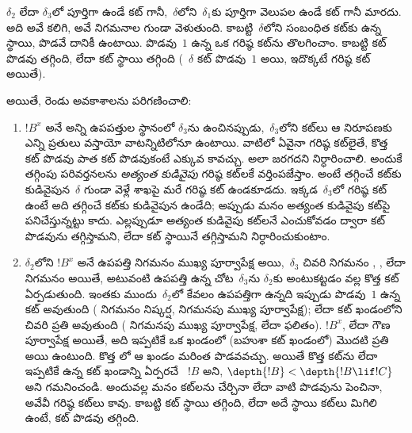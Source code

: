 \documentclass[../../../include/open-logic-section]{subfiles}
\begin{document}
$\delta_2$ లేదా $\delta_3$లో పూర్తిగా ఉండే కట్ గానీ,~$\delta$లోని~$\delta_1$కు పూర్తిగా వెలుపల ఉండే కట్ గానీ మారదు. అది అవే  కలిగి, అవే నిగమనాల గుండా వెళుతుంది. కాబట్టి~$\delta$లోని సంబంధిత కట్‌కు ఉన్న స్థాయి, పొడవే దానికీ ఉంటాయి. పొడవు~$1$ ఉన్న ఒక గరిష్ఠ కట్‌ను తొలగించాం. కాబట్టి కట్ పొడవు తగ్గింది, లేదా కట్ స్థాయి తగ్గింది (~$\delta$ కట్ పొడవు~$1$ అయి, ఇదొక్కటే గరిష్ఠ కట్ అయితే).

అయితే, రెండు అవకాశాలను పరిగణించాలి:
\begin{enumerate}
  \item $!B^x$ అనే అన్ని ఉపపత్తుల స్థానంలో $\delta_3$ను ఉంచినప్పుడు,~$\delta_3$లోని కట్‌లు ఆ నిరూపణకు ఎన్ని ప్రతులు వస్తాయో వాటన్నిటిలోనూ ఉంటాయి. వాటిలో ఏవైనా గరిష్ఠ కట్‌లైతే, కొత్త  కట్ పొడవు పాత  కట్ పొడవుకంటే ఎక్కువ కావచ్చు. అలా జరగదని నిర్ధారించాలి. అందుకే తగ్గింపు పరివర్తనలను \emph{అత్యంత కుడివైపు} గరిష్ఠ కట్‌లకే వర్తింపజేస్తాం. అంటే తగ్గించే కట్‌కు కుడివైపున~$\delta$ గుండా వెళ్లే శాఖపై మరే గరిష్ఠ కట్ ఉండకూడదు. ఇక్కడ~$\delta_3$లో గరిష్ఠ కట్ ఉంటే అది తగ్గించే కట్‌కు కుడివైపున ఉండేది; అప్పుడు మనం అత్యంత కుడివైపు కట్‌పై పనిచేస్తున్నట్టు కాదు. ఎల్లప్పుడూ అత్యంత కుడివైపు కట్‌లనే ఎంచుకోవడం ద్వారా  కట్ పొడవును తగ్గిస్తామని, లేదా కట్ స్థాయినే తగ్గిస్తామని నిర్ధారించుకుంటాం.
  \item $\delta_2$లోని $!B^x$ అనే ఉపపత్తి  నిగమనం ముఖ్య పూర్వాపేక్ష అయి,~$\delta_3$ చివరి నిగమనం \Elim{\lor}, \Elim{\lexists}, లేదా  నిగమనం అయితే, అటువంటి ఉపపత్తి ఉన్న చోట~$\delta_3$ను $\delta_2$కు అంటుకట్టడం వల్ల కొత్త కట్ ఏర్పడుతుంది. ఇంతకు ముందు~$\delta_2$లో కేవలం ఉపపత్తిగా ఉన్నది ఇప్పుడు పొడవు~$1$ ఉన్న కట్ అవుతుంది ( నిగమనం నిష్కర్ష,  నిగమనపు ముఖ్య పూర్వాపేక్ష); లేదా కట్ ఖండంలోని చివరి  ప్రతి అవుతుంది ( నిగమనపు ముఖ్య పూర్వాపేక్ష, \Elim{\lor} లేదా \Elim{\lexists} ఫలితం). $!B^x$, \Elim{\lor} లేదా \Elim{\lexists} గౌణ పూర్వాపేక్ష అయితే, అది ఇప్పటికే ఒక ఖండంలో (బహుశా కట్ ఖండంలో) మొదటి  ప్రతి అయి ఉంటుంది. కొత్త లో ఆ ఖండం మరింత పొడవవచ్చు. అయితే కొత్త కట్‌ను లేదా ఇప్పటికే ఉన్న కట్ ఖండాన్ని ఏర్పరచే ~$!B$ అని, $\depth{!B} < \depth{!B \lif !C}$ అని గమనించండి. అందువల్ల మనం కట్‌లను చేర్చినా లేదా వాటి పొడవును పెంచినా, అవేవీ గరిష్ఠ కట్‌లు కావు. కాబట్టి కట్ స్థాయి తగ్గింది, లేదా అదే స్థాయి కట్‌లు మిగిలి ఉంటే, కట్ పొడవు తగ్గింది.
\end{enumerate}
\end{document}

